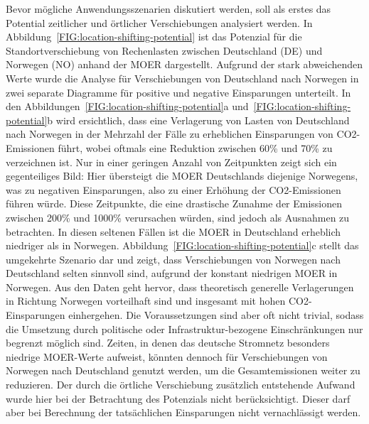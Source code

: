 Bevor mögliche Anwendungsszenarien diskutiert werden, soll als erstes das Potential zeitlicher und örtlicher Verschiebungen analysiert werden.
In Abbildung~\ref{FIG:location-shifting-potential} ist das Potenzial für die Standortverschiebung von Rechenlasten zwischen Deutschland (DE) und Norwegen (NO) anhand der \ac{MOER} dargestellt.
Aufgrund der stark abweichenden Werte wurde die Analyse für Verschiebungen von Deutschland nach Norwegen in zwei separate Diagramme für positive und negative Einsparungen unterteilt.
In den Abbildungen~\ref{FIG:location-shifting-potential}a und~\ref{FIG:location-shifting-potential}b wird ersichtlich, dass eine Verlagerung von Lasten von Deutschland nach Norwegen in der Mehrzahl der Fälle zu erheblichen Einsparungen von CO2-Emissionen führt, wobei oftmals eine Reduktion zwischen 60\% und 70\% zu verzeichnen ist.
Nur in einer geringen Anzahl von Zeitpunkten zeigt sich ein gegenteiliges Bild:
Hier übersteigt die \ac{MOER} Deutschlands diejenige Norwegens, was zu negativen Einsparungen, also zu einer Erhöhung der CO2-Emissionen führen würde.
Diese Zeitpunkte, die eine drastische Zunahme der Emissionen zwischen 200\% und 1000\% verursachen würden, sind jedoch als Ausnahmen zu betrachten.
In diesen seltenen Fällen ist die \ac{MOER} in Deutschland erheblich niedriger als in Norwegen.
Abbildung~\ref{FIG:location-shifting-potential}c stellt das umgekehrte Szenario dar und zeigt, dass Verschiebungen von Norwegen nach Deutschland selten sinnvoll sind, aufgrund der konstant niedrigen \ac{MOER} in Norwegen.
Aus den Daten geht hervor, dass theoretisch generelle Verlagerungen in Richtung Norwegen vorteilhaft sind und insgesamt mit hohen CO2-Einsparungen einhergehen.
Die Voraussetzungen sind aber oft nicht trivial, sodass die Umsetzung durch politische oder Infrastruktur-bezogene Einschränkungen nur begrenzt möglich sind.
Zeiten, in denen das deutsche Stromnetz besonders niedrige \ac{MOER}-Werte aufweist, könnten dennoch für Verschiebungen von Norwegen nach Deutschland genutzt werden, um die Gesamtemissionen weiter zu reduzieren.
Der durch die örtliche Verschiebung zusätzlich entstehende Aufwand wurde hier bei der Betrachtung des Potenzials nicht berücksichtigt.
Dieser darf aber bei Berechnung der tatsächlichen Einsparungen nicht vernachlässigt werden.

